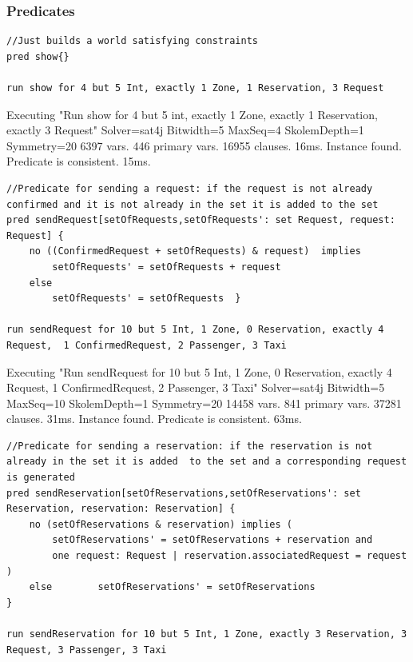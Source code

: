 \subsubsection{Predicates}

\begin{lstlisting}[breaklines=true,showstringspaces=false]
//Just builds a world satisfying constraints
pred show{}

run show for 4 but 5 Int, exactly 1 Zone, 1 Reservation, 3 Request
\end{lstlisting}


\begin{framed}
Executing "Run show for 4 but 5 int, exactly 1 Zone, exactly 1 Reservation, exactly 3 Request" 
Solver=sat4j Bitwidth=5 MaxSeq=4 SkolemDepth=1 Symmetry=20 
6397 vars. 446 primary vars. 16955 clauses. 16ms. 
Instance found. Predicate is consistent. 15ms.
\end{framed}

\begin{lstlisting}[breaklines=true,showstringspaces=false]
//Predicate for sending a request: if the request is not already confirmed and it is not already in the set it is added to the set  
pred sendRequest[setOfRequests,setOfRequests': set Request, request: Request] { 	 	
	no ((ConfirmedRequest + setOfRequests) & request)  implies  		 		
		setOfRequests' = setOfRequests + request  	
	else 		
		setOfRequests' = setOfRequests  }

run sendRequest for 10 but 5 Int, 1 Zone, 0 Reservation, exactly 4 Request,  1 ConfirmedRequest, 2 Passenger, 3 Taxi
\end{lstlisting}


\begin{framed}
Executing "Run sendRequest for 10 but 5 Int, 1 Zone, 0 Reservation, exactly 4 Request,  1 ConfirmedRequest, 2 Passenger, 3 Taxi"    
Solver=sat4j Bitwidth=5 MaxSeq=10 SkolemDepth=1 Symmetry=20    
14458 vars. 841 primary vars. 37281 clauses. 31ms.    
Instance found. Predicate is consistent. 63ms.
\end{framed}

\begin{lstlisting}[breaklines=true,showstringspaces=false]
//Predicate for sending a reservation: if the reservation is not already in the set it is added  to the set and a corresponding request is generated 
pred sendReservation[setOfReservations,setOfReservations': set Reservation, reservation: Reservation] { 	 	
	no (setOfReservations & reservation) implies ( 		
		setOfReservations' = setOfReservations + reservation and  		 		
		one request: Request | reservation.associatedRequest = request ) 	
	else 		setOfReservations' = setOfReservations  
}

run sendReservation for 10 but 5 Int, 1 Zone, exactly 3 Reservation, 3 Request, 3 Passenger, 3 Taxi
\end{lstlisting}


